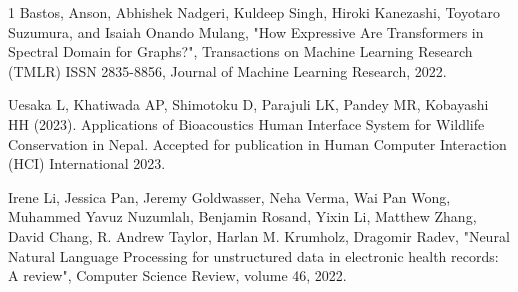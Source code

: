 \begin{雑誌論文}{1}
Bastos, Anson, Abhishek Nadgeri, Kuldeep Singh, Hiroki Kanezashi, Toyotaro Suzumura, and Isaiah Onando Mulang, "How Expressive Are Transformers in Spectral Domain for Graphs?", Transactions on Machine Learning Research (TMLR) ISSN 2835-8856, Journal of Machine Learning Research, 2022.

Uesaka L, Khatiwada AP, Shimotoku D, Parajuli LK, Pandey MR, Kobayashi HH (2023). Applications of Bioacoustics Human Interface System for Wildlife Conservation in Nepal. Accepted for publication in Human Computer Interaction (HCI) International 2023.


Irene Li, Jessica Pan, Jeremy Goldwasser, Neha Verma, Wai Pan Wong, Muhammed Yavuz Nuzumlalı, Benjamin Rosand, Yixin Li, Matthew Zhang, David Chang, R. Andrew Taylor, Harlan M. Krumholz, Dragomir Radev, "Neural Natural Language Processing for unstructured data in electronic health records: A review", Computer Science Review, volume 46, 2022.

\end{雑誌論文}

